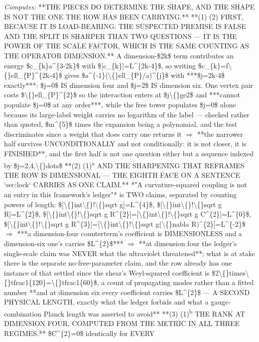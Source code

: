 \begin{description}
\emph{Computes:} **THE PIECES DO DETERMINE THE SHAPE, AND THE SHAPE IS NOT THE ONE THE ROW HAS BEEN CARRYING.**  **(1) (2) FIRST, BECAUSE IT IS LOAD-BEARING: THE SUSPECTED PREMISE IS FALSE AND THE SPLIT IS SHARPER THAN TWO QUESTIONS --- IT IS THE POWER OF THE SCALE FACTOR, WHICH IS THE SAME COUNTING AS THE OPERATOR DIMENSION.** A dimension-\$2k\$ term contributes an energy \$c\_\{k\}a\textasciicircum{}\{3-2k\}\$ with \$[c\_\{k\}]=L\textasciicircum{}\{2k-4\}\$, so writing \$c\_\{k\}=f\textbackslash\{\}ell\_\{P\}\textasciicircum{}\{2k-4\}\$ gives \$a\textasciicircum{}\{-1\}(\textbackslash\{\}ell\_\{P\}/a)\textasciicircum{}\{j\}\$ with ***\$j=2k-4\$ exactly***: \$j=0\$ IS dimension four and \$j=2\$ IS dimension six. One vertex pair costs \$\textbackslash\{\}ell\_\{P\}\textasciicircum{}\{2\}\$ so the interaction enters at \$j\textbackslash\{\}ge2\$ and ***cannot populate \$j=0\$ at any order***, while the free tower populates \$j=0\$ alone because its large-label weight carries no logarithm of the label --- checked rather than quoted, \$m\textasciicircum{}\{5\}\$ times the expansion being a polynomial, and the test discriminates since a weight that does carry one returns it \ensuremath{\Rightarrow} **the narrower half survives UNCONDITIONALLY and not conditionally: it is not closer, it is FINISHED**, and the first half is not one question either but a sequence indexed by \$j=2,4,\textbackslash\{\}dots\$  **(2) (1)\textsuperscript{a} AND THE SHARPENING THAT REFRAMES THE ROW IS DIMENSIONAL --- THE EIGHTH FACE ON A SENTENCE `sec:lock` CARRIES AS ONE CLAIM.** *"A curvature-squared coupling is not an entry in this framework's ledger"* is TWO claims, separated by counting powers of length: \$[\textbackslash\{\}int\textbackslash\{\}!\textbackslash\{\}sqrt g]=L\textasciicircum{}\{4\}\$, \$[\textbackslash\{\}int\textbackslash\{\}!\textbackslash\{\}sqrt g R]=L\textasciicircum{}\{2\}\$, \$[\textbackslash\{\}int\textbackslash\{\}!\textbackslash\{\}sqrt g R\textasciicircum{}\{2\}]=[\textbackslash\{\}int\textbackslash\{\}!\textbackslash\{\}sqrt g C\textasciicircum{}\{2\}]=L\textasciicircum{}\{0\}\$, \$[\textbackslash\{\}int\textbackslash\{\}!\textbackslash\{\}sqrt g R\textasciicircum{}\{3\}]=[\textbackslash\{\}int\textbackslash\{\}!\textbackslash\{\}sqrt g(\textbackslash\{\}nabla R)\textasciicircum{}\{2\}]=L\textasciicircum{}\{-2\}\$ \ensuremath{\Rightarrow} ***a dimension-four counterterm's coefficient is DIMENSIONLESS and a dimension-six one's carries \$L\textasciicircum{}\{2\}\$*** \ensuremath{\Rightarrow} **at dimension four the ledger's single-scale claim was NEVER what the ultraviolet threatened**; what is at stake there is the separate no-free-parameter claim, and the row already has one instance of that settled since the shear's Weyl-squared coefficient is \$2\textbackslash\{\}times\textbackslash\{\}tfrac1\{120\}=\textbackslash\{\}tfrac1\{60\}\$, a count of propagating modes rather than a fitted number  **and at dimension six every coefficient carries \$L\textasciicircum{}\{2\}\$ --- A SECOND PHYSICAL LENGTH, exactly what the ledger forbids and what a gauge-combination Planck length was asserted to avoid**  **(3) (1)\textsuperscript{b} THE RANK AT DIMENSION FOUR, COMPUTED FROM THE METRIC IN ALL THREE REGIMES.** \$C\textasciicircum{}\{2\}=0\$ identically for EVERY 
\end{description}
